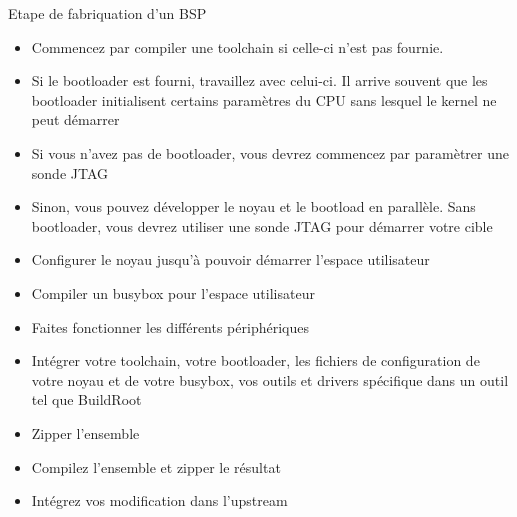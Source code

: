 \begin{frame}[fragile=singleslide]{Etape de fabriquation d'un BSP}
  \begin{itemize}
  \item  Commencez par compiler  une toolchain  si celle-ci  n'est pas
    fournie.
  \item  Si le  bootloader est  fourni, travaillez  avec  celui-ci. Il
    arrive souvent que les bootloader initialisent certains paramètres
    du CPU sans lesquel le kernel ne peut démarrer
  \item Si  vous n'avez pas  de bootloader, vous devrez  commencez par
    paramètrer une sonde JTAG
  \item  Sinon, vous  pouvez développer  le  noyau et  le bootload  en
    parallèle. Sans  bootloader, vous  devrez utiliser une  sonde JTAG
    pour démarrer votre cible
  \item  Configurer   le  noyau  jusqu'à   pouvoir  démarrer  l'espace
    utilisateur
  \item Compiler un busybox pour l'espace utilisateur
  \item Faites fonctionner les différents périphériques
  \item Intégrer  votre toolchain,  votre bootloader, les  fichiers de
    configuration de  votre noyau et  de votre busybox, vos  outils et
    drivers spécifique dans un outil tel que BuildRoot
  \item Zipper l'ensemble
  \item Compilez l'ensemble et zipper le résultat
  \item Intégrez vos modification dans l'upstream
  \end{itemize}
\end{frame} 




